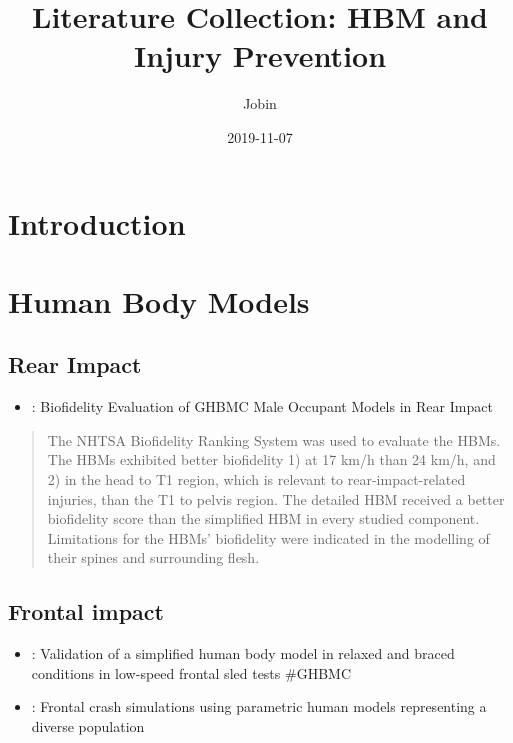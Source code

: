 \documentclass[]{book}
\title{Literature Collection: HBM and Injury Prevention}
\author{Jobin}
\date{2019-11-07}
\providecommand{\tightlist}{%
  \setlength{\itemsep}{0pt}\setlength{\parskip}{0pt}}
\begin{document}
\maketitle

{
\setcounter{tocdepth}{1}
\tableofcontents
}
\hypertarget{introduction}{%
\chapter{Introduction}\label{introduction}}

\hypertarget{human-body-models}{%
\chapter{Human Body Models}\label{human-body-models}}

\hypertarget{rear-impact}{%
\section{Rear Impact}\label{rear-impact}}

\begin{itemize}
\tightlist
\item
  \citet{Katagiri2019}: Biofidelity Evaluation of GHBMC Male Occupant Models in Rear Impact
\end{itemize}

\begin{quote}
The NHTSA Biofidelity Ranking System was used to evaluate the HBMs. The HBMs exhibited better biofidelity 1) at 17 km/h than 24 km/h, and 2) in the head to T1 region, which is relevant to rear-impact-related injuries, than the T1 to pelvis region. The detailed HBM received a better biofidelity score than the simplified HBM in every studied component. Limitations for the HBMs' biofidelity were indicated in the modelling of their spines and surrounding flesh.
\end{quote}

\hypertarget{frontal-impact}{%
\section{Frontal impact}\label{frontal-impact}}

\begin{itemize}
\item
  \citet{Devane2019}: Validation of a simplified human body model in relaxed and braced conditions in low-speed frontal sled tests
  \#GHBMC
\item
  \citet{Hu2019}: Frontal crash simulations using parametric human models representing a diverse population
\end{itemize}
\end{document}
